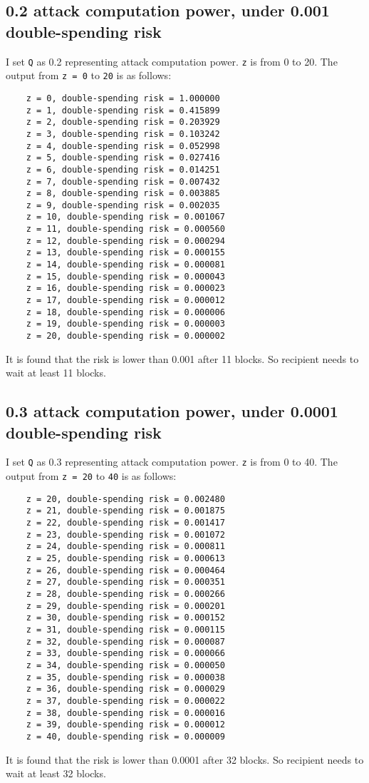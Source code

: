\documentclass{article}
\begin{document}
\subsection{0.2 attack computation power, under 0.001 double-spending risk}
I set \verb|Q| as 0.2 representing attack computation power. \verb|z| is from 0 to 20.
The output from \verb|z = 0| to \verb|20| is as follows:\\
\begin{verbatim}
    z = 0, double-spending risk = 1.000000
    z = 1, double-spending risk = 0.415899
    z = 2, double-spending risk = 0.203929
    z = 3, double-spending risk = 0.103242
    z = 4, double-spending risk = 0.052998
    z = 5, double-spending risk = 0.027416
    z = 6, double-spending risk = 0.014251
    z = 7, double-spending risk = 0.007432
    z = 8, double-spending risk = 0.003885
    z = 9, double-spending risk = 0.002035
    z = 10, double-spending risk = 0.001067
    z = 11, double-spending risk = 0.000560
    z = 12, double-spending risk = 0.000294
    z = 13, double-spending risk = 0.000155
    z = 14, double-spending risk = 0.000081
    z = 15, double-spending risk = 0.000043
    z = 16, double-spending risk = 0.000023
    z = 17, double-spending risk = 0.000012
    z = 18, double-spending risk = 0.000006
    z = 19, double-spending risk = 0.000003
    z = 20, double-spending risk = 0.000002
\end{verbatim}
It is found that the risk is lower than 0.001 after 11 blocks. So recipient needs to wait at least 11 blocks.
\subsection{0.3 attack computation power, under 0.0001 double-spending risk}
I set \verb|Q| as 0.3 representing attack computation power. \verb|z| is from 0 to 40.
The output from \verb|z = 20| to \verb|40| is as follows:\\
\begin{verbatim}
    z = 20, double-spending risk = 0.002480
    z = 21, double-spending risk = 0.001875
    z = 22, double-spending risk = 0.001417
    z = 23, double-spending risk = 0.001072
    z = 24, double-spending risk = 0.000811
    z = 25, double-spending risk = 0.000613
    z = 26, double-spending risk = 0.000464
    z = 27, double-spending risk = 0.000351
    z = 28, double-spending risk = 0.000266
    z = 29, double-spending risk = 0.000201
    z = 30, double-spending risk = 0.000152
    z = 31, double-spending risk = 0.000115
    z = 32, double-spending risk = 0.000087
    z = 33, double-spending risk = 0.000066
    z = 34, double-spending risk = 0.000050
    z = 35, double-spending risk = 0.000038
    z = 36, double-spending risk = 0.000029
    z = 37, double-spending risk = 0.000022
    z = 38, double-spending risk = 0.000016
    z = 39, double-spending risk = 0.000012
    z = 40, double-spending risk = 0.000009
\end{verbatim}
It is found that the risk is lower than 0.0001 after 32 blocks. So recipient needs to wait at least 32 blocks.
\end{document}
